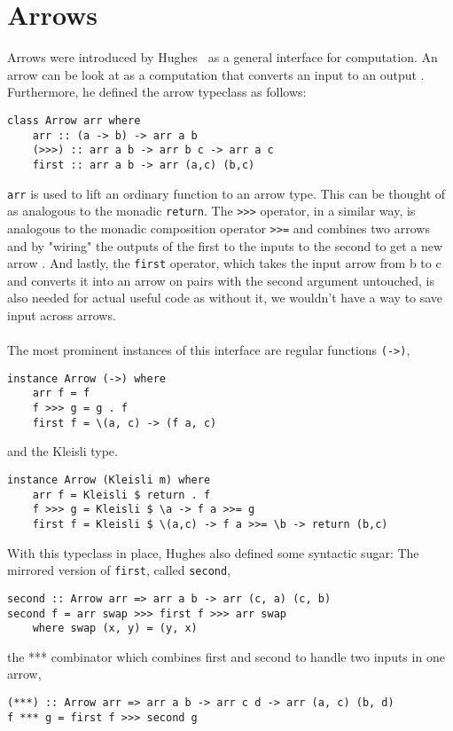 \section{Arrows}
Arrows were introduced by Hughes \citHughes ~as a general interface for computation. An arrow  can be look at as a computation that converts an input  to an output . Furthermore, he defined the arrow typeclass as follows:
\begin{lstlisting}[frame=htrbl]
class Arrow arr where
	arr :: (a -> b) -> arr a b
	(>>>) :: arr a b -> arr b c -> arr a c
	first :: arr a b -> arr (a,c) (b,c)
\end{lstlisting}
\lstinline{arr} is used to lift an ordinary function to an arrow type. This can be thought of as analogous to the monadic \lstinline{return}. The \lstinline{>>>} operator, in a similar way, is analogous to the monadic composition operator \lstinline{>>=} and combines two arrows  and  by "wiring" the outputs of the first to the inputs to the second to get a new arrow . And lastly, the \lstinline{first} operator, which takes the input arrow from b to c and converts it into an arrow on pairs with the second argument untouched, is also needed for actual useful code as without it, we wouldn't have a way to save input across arrows.
\\\\
The most prominent instances of this interface are regular functions \lstinline{(->)},
\begin{lstlisting}[frame=htrbl]
instance Arrow (->) where
	arr f = f
	f >>> g = g . f
	first f = \(a, c) -> (f a, c) 
\end{lstlisting}
and the Kleisli type.
\begin{lstlisting}[frame=htrbl]
instance Arrow (Kleisli m) where
	arr f = Kleisli $ return . f
	f >>> g = Kleisli $ \a -> f a >>= g
	first f = Kleisli $ \(a,c) -> f a >>= \b -> return (b,c)
\end{lstlisting}
With this typeclass in place, Hughes also defined some syntactic sugar: The mirrored version of \lstinline{first}, called \lstinline{second},
\begin{lstlisting}[frame=htrbl]
second :: Arrow arr => arr a b -> arr (c, a) (c, b)
second f = arr swap >>> first f >>> arr swap
	where swap (x, y) = (y, x)
\end{lstlisting}
the *** combinator which combines first and second to handle two inputs in one arrow,
\begin{lstlisting}[frame=htrbl]
(***) :: Arrow arr => arr a b -> arr c d -> arr (a, c) (b, d)
f *** g = first f >>> second g
\end{lstlisting}

